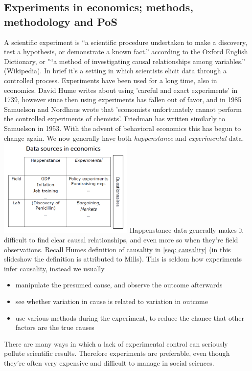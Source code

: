 \documentclass[12pt, a4paper]{article}
\begin{document}
\begin{multicols}{2}
\subsection{Experiments in economics; methods, methodology and PoS}
A scientific experiment is “a scientific procedure undertaken to make a discovery, test a hypothesis, or demonstrate a known fact.” according to the Oxford English Dictionary, or "“a method of investigating causal relationships among variables.” (Wikipedia). In brief it's a setting in which scientists elicit data through a controlled process. Experiments have been used for a long time, also in economics. David Hume writes about using 'careful and exact experiments' in 1739, however since then using experiments has fallen out of favor, and in 1985 Samuelson and Nordhaus wrote that 'economists unfortunately cannot perform the controlled experiments of chemists'. Friedman has written similarly to Samuelson in 1953. With the advent of behavioral economics this has begun to change again. We now generally have both \textit{happenstance} and \textit{experimental} data.
\includegraphics[width = 0.5\textwidth]{Capture.PNG}
Happenstance data generally makes it difficult to find clear causal relationships, and even more so when they're field observations. Recall Humes definition of causality in \ref{seq: causality} (in this slideshow the definition is attributed to Mills). This is seldom how experiments infer causality, instead we usually 
\begin{itemize}
\item manipulate the presumed cause, and observe the outcome afterwards
\item see whether variation in cause is related to variation in outcome
\item use various methods during the experiment, to reduce the chance that other factors are the true causes
\end{itemize}
There are many ways in which a lack of experimental control can seriously pollute scientific results. Therefore experiments are preferable, even though they're often very expensive and difficult to manage in social sciences. 


\end{multicols}
\end{document}

